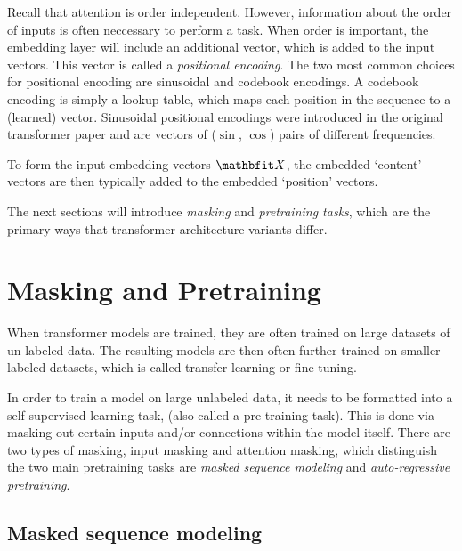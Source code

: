 Recall that attention is order independent. However, information about the order of inputs is often neccessary to perform a task. When order is important, the embedding layer will include an additional vector, which is added to the input vectors. This vector is called a \textit{positional encoding}. The two most common choices for positional encoding are sinusoidal and codebook encodings. A codebook encoding is simply a lookup table, which maps each position in the sequence to a (learned) vector. Sinusoidal positional encodings were introduced in the original transformer paper \cite{attention-is-all-you-need} and are vectors of ($\sin$, $\cos$) pairs of different frequencies.

To form the input embedding vectors $\X$, the embedded `content' vectors are then typically added to the embedded `position' vectors.

The next sections will introduce \textit{masking} and \textit{pretraining tasks}, which are the primary ways that transformer architecture variants differ.

\section{Masking and Pretraining}
\label{s:masking}

When transformer models are trained, they are often trained on large datasets of un-labeled data. The resulting models are then often further trained on smaller labeled datasets, which is called transfer-learning or fine-tuning.

In order to train a model on large unlabeled data, it needs to be formatted into a self-supervised learning task, (also called a pre-training task). This is done via masking out certain inputs and/or connections within the model itself. There are two types of masking, input masking and attention masking, which distinguish the two main pretraining tasks are \textit{masked sequence modeling} and \textit{auto-regressive pretraining}.

\subsection{Masked sequence modeling}
\label{ss:msm}


